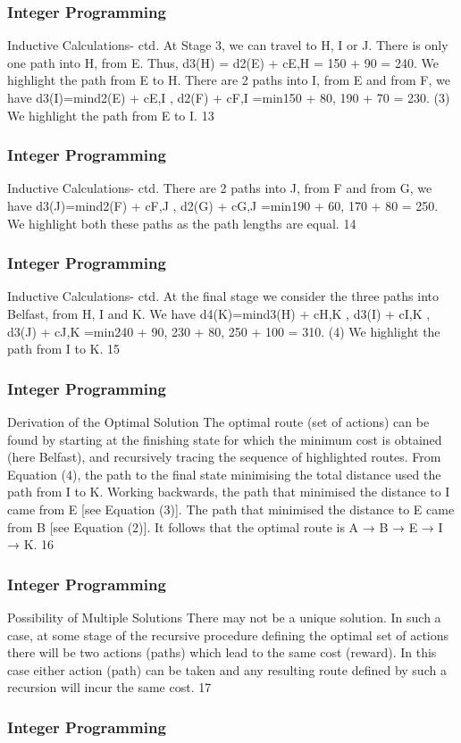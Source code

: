\begin{frame} 
	
	\frametitle{Integer Programming}     
Inductive Calculations- ctd.
At Stage 3, we can travel to H, I or J. There is only one path into
H, from E. Thus,
d3(H) = d2(E) + cE,H = 150 + 90 = 240.
We highlight the path from E to H.
There are 2 paths into I, from E and from F, we have
d3(I)=min{d2(E) + cE,I
, d2(F) + cF,I }
=min{150 + 80, 190 + 70} = 230. (3)
We highlight the path from E to I.
13 
\end{frame}  
\begin{frame} 
\frametitle{Integer Programming}     
Inductive Calculations- ctd.
There are 2 paths into J, from F and from G, we have
d3(J)=min{d2(F) + cF,J , d2(G) + cG,J }
=min{190 + 60, 170 + 80} = 250.
We highlight both these paths as the path lengths are equal.
14 \end{frame}  \begin{frame} \frametitle{Integer Programming}     
Inductive Calculations- ctd.
At the final stage we consider the three paths into Belfast, from
H, I and K. We have
d4(K)=min{d3(H) + cH,K , d3(I) + cI,K , d3(J) + cJ,K }
=min{240 + 90, 230 + 80, 250 + 100} = 310. (4)
We highlight the path from I to K.
15 \end{frame}  \begin{frame} \frametitle{Integer Programming}     
Derivation of the Optimal Solution
The optimal route (set of actions) can be found by starting at the
finishing state for which the minimum cost is obtained (here
Belfast), and recursively tracing the sequence of highlighted routes.
From Equation (4), the path to the final state minimising the total
distance used the path from I to K.
Working backwards, the path that minimised the distance to I
came from E [see Equation (3)]. The path that minimised the
distance to E came from B [see Equation (2)]. It follows that the
optimal route is A → B → E → I → K.
16 \end{frame}  \begin{frame} \frametitle{Integer Programming}     
Possibility of Multiple Solutions
There may not be a unique solution.
In such a case, at some stage of the recursive procedure defining
the optimal set of actions there will be two actions (paths) which
lead to the same cost (reward).
In this case either action (path) can be taken and any resulting
route defined by such a recursion will incur the same cost.
17 \end{frame}  \begin{frame} \frametitle{Integer Programming}     

\end{frame}
